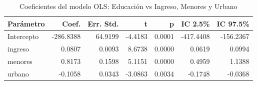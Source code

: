 \begin{table}[H]
    \centering
    \color{blue}
    \caption{Coeficientes del modelo OLS: Educación vs Ingreso, Menores y Urbano}
    \label{tab:ols_coef_educacion}
    \begin{tabular}{lrrrrrr}
        \toprule
            Parámetro & Coef. & Err. Std. & t & p & IC 2.5\% & IC 97.5\% \\
        \midrule
            Intercepto & -286.8388 & 64.9199 & -4.4183 & 0.0001 & -417.4408 & -156.2367 \\
            ingreso & 0.0807 & 0.0093 & 8.6738 & 0.0000 & 0.0619 & 0.0994 \\
            menores & 0.8173 & 0.1598 & 5.1151 & 0.0000 & 0.4959 & 1.1388 \\
            urbano & -0.1058 & 0.0343 & -3.0863 & 0.0034 & -0.1748 & -0.0368 \\
        \bottomrule
    \end{tabular}
\end{table}
